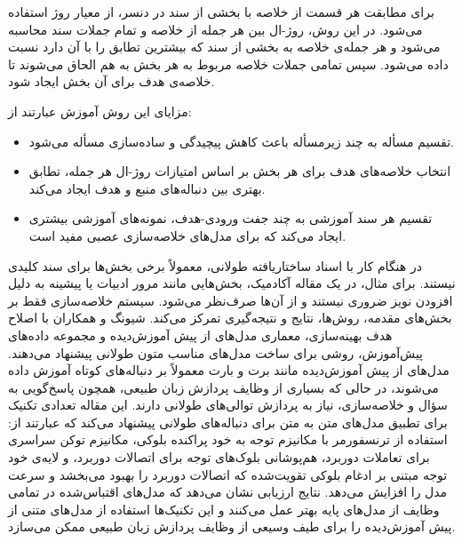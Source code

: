 برای مطابقت هر قسمت از خلاصه با بخشی از سند در دنسر، از معیار روژ استفاده می‌شود. در این روش، روژ-ال بین هر جمله از خلاصه و تمام جملات سند محاسبه می‌شود و هر جمله‌ی خلاصه به بخشی از سند که بیشترین تطابق را با آن دارد نسبت داده می‌شود. سپس تمامی جملات خلاصه مربوط به هر بخش به هم الحاق می‌شوند تا خلاصه‌ی هدف برای آن بخش ایجاد شود.

مزایای این روش آموزش عبارتند از: 
\begin{itemize} 
	\item تقسیم مسأله به چند زیرمسأله باعث کاهش پیچیدگی و ساده‌سازی مسأله می‌شود. \item انتخاب خلاصه‌های هدف برای هر بخش بر اساس امتیازات روژ-ال هر جمله، تطابق بهتری بین دنباله‌های منبع و هدف ایجاد می‌کند.
	 \item تقسیم هر سند آموزشی به چند جفت ورودی-هدف، نمونه‌های آموزشی بیشتری ایجاد می‌کند که برای مدل‌های خلاصه‌سازی عصبی مفید است. 
	 \end{itemize}
	 در هنگام کار با اسناد ساختاریافته طولانی، معمولاً برخی بخش‌ها برای سند کلیدی نیستند. برای مثال، در یک مقاله آکادمیک، بخش‌هایی مانند مرور ادبیات یا پیشینه به دلیل افزودن نویز ضروری نیستند و از آن‌ها صرف‌نظر می‌شود. سیستم خلاصه‌سازی فقط بر بخش‌های مقدمه، روش‌ها، نتایج و نتیجه‌گیری تمرکز می‌کند. شیونگ و همکاران با اصلاح هدف بهینه‌سازی، معماری مدل‌های از پیش آموزش‌دیده و مجموعه داده‌های پیش‌آموزش، روشی برای ساخت مدل‌های مناسب متون طولانی پیشنهاد می‌دهند. مدل‌های از پیش آموزش‌دیده مانند برت و بارت معمولاً بر دنباله‌های کوتاه آموزش داده می‌شوند، در حالی که بسیاری از وظایف پردازش زبان طبیعی، همچون پاسخ‌گویی به سؤال و خلاصه‌سازی، نیاز به پردازش توالی‌های طولانی دارند. این مقاله تعدادی تکنیک برای تطبیق مدل‌های متن به متن برای دنباله‌های طولانی پیشنهاد می‌کند که عبارتند از: استفاده از ترنسفورمر با مکانیزم توجه به خود پراکنده بلوکی، مکانیزم توکن سراسری برای تعاملات دوربرد، هم‌پوشانی بلوک‌های توجه برای اتصالات دوربرد، و لایه‌ی خود توجه مبتنی بر ادغام بلوکی تقویت‌شده که اتصالات دوربرد را بهبود می‌بخشد و سرعت مدل را افزایش می‌دهد. نتایج ارزیابی نشان می‌دهد که مدل‌های اقتباس‌شده در تمامی وظایف از مدل‌های پایه بهتر عمل می‌کنند و این تکنیک‌ها استفاده از مدل‌های متنی از پیش آموزش‌دیده را برای طیف وسیعی از وظایف پردازش زبان طبیعی ممکن می‌سازد\cite{Xiong2022AdaptingPT}.


